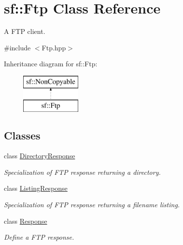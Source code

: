 \hypertarget{classsf_1_1_ftp}{}\section{sf\+:\+:Ftp Class Reference}
\label{classsf_1_1_ftp}


A F\+TP client.  




{\ttfamily \#include $<$Ftp.\+hpp$>$}

Inheritance diagram for sf\+:\+:Ftp\+:\begin{figure}[H]
\begin{center}
\leavevmode
\includegraphics[height=2.000000cm]{classsf_1_1_ftp}
\end{center}
\end{figure}
\subsection*{Classes}
\begin{DoxyCompactItemize}
\item 
class \hyperlink{classsf_1_1_ftp_1_1_directory_response}{Directory\+Response}
\begin{DoxyCompactList}\small\item\em Specialization of F\+TP response returning a directory. \end{DoxyCompactList}\item 
class \hyperlink{classsf_1_1_ftp_1_1_listing_response}{Listing\+Response}
\begin{DoxyCompactList}\small\item\em Specialization of F\+TP response returning a filename listing. \end{DoxyCompactList}\item 
class \hyperlink{classsf_1_1_ftp_1_1_response}{Response}
\begin{DoxyCompactList}\small\item\em Define a F\+TP response. \end{DoxyCompactList}\end{DoxyCompactItemize}
